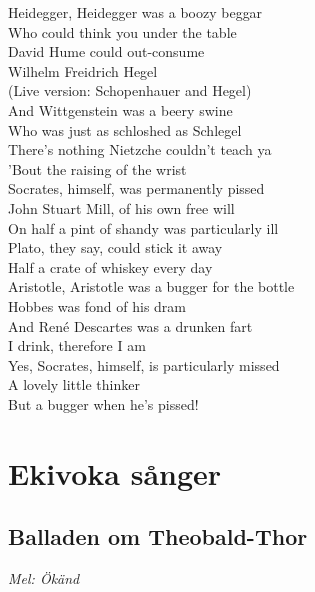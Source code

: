 \documentclass[twoside, openright]{report}
\begin{document}
Heidegger, Heidegger was a boozy beggar\\
Who could think you under the table\\

David Hume could out-consume\\
Wilhelm Freidrich Hegel\\
(Live version: Schopenhauer and Hegel)\\

And Wittgenstein was a beery swine\\
Who was just as schloshed as Schlegel\\

There's nothing Nietzche couldn't teach ya\\
'Bout the raising of the wrist\\
Socrates, himself, was permanently pissed\\

John Stuart Mill, of his own free will\\
On half a pint of shandy was particularly ill\\

Plato, they say, could stick it away\\
Half a crate of whiskey every day\\

Aristotle, Aristotle was a bugger for the bottle\\
Hobbes was fond of his dram\\

And René Descartes was a drunken fart\\
I drink, therefore I am\\

Yes, Socrates, himself, is particularly missed\\
A lovely little thinker\\
But a bugger when he's pissed!\\

\chapter{Ekivoka sånger}

\section{Balladen om Theobald-Thor}
\textit{Mel: Ökänd}\\
\end{document}
